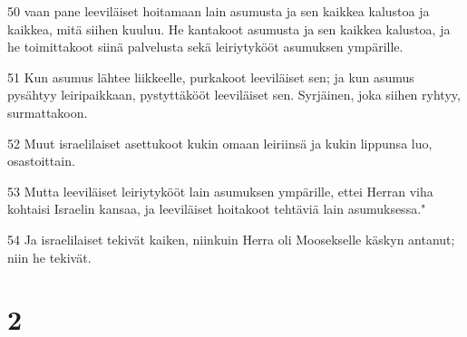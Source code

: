 \par 50 vaan pane leeviläiset hoitamaan lain asumusta ja sen kaikkea kalustoa ja kaikkea, mitä siihen kuuluu. He kantakoot asumusta ja sen kaikkea kalustoa, ja he toimittakoot siinä palvelusta sekä leiriytykööt asumuksen ympärille.
\par 51 Kun asumus lähtee liikkeelle, purkakoot leeviläiset sen; ja kun asumus pysähtyy leiripaikkaan, pystyttäkööt leeviläiset sen. Syrjäinen, joka siihen ryhtyy, surmattakoon.
\par 52 Muut israelilaiset asettukoot kukin omaan leiriinsä ja kukin lippunsa luo, osastoittain.
\par 53 Mutta leeviläiset leiriytykööt lain asumuksen ympärille, ettei Herran viha kohtaisi Israelin kansaa, ja leeviläiset hoitakoot tehtäviä lain asumuksessa."
\par 54 Ja israelilaiset tekivät kaiken, niinkuin Herra oli Moosekselle käskyn antanut; niin he tekivät.

\chapter{2}


